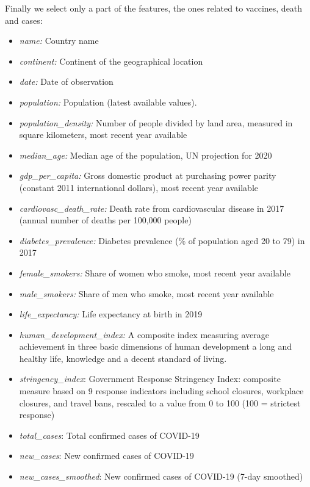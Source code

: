 \documentclass[10pt,conference]{IEEEtran}
\begin{document}
Finally we select only a part of the features, the ones related to vaccines, death and cases:
\begin{itemize}
		\item \emph{name:} Country name
		\item \emph{continent:} Continent of the geographical location
		\item \emph{date:} Date of observation
		
		\item \emph{population:} Population (latest available values).
		\item \emph{population\_density:} Number of people divided by land area, measured in square kilometers, most recent year available
		\item \emph{median\_age:} Median age of the population, UN projection for 2020
		\item \emph{gdp\_per\_capita:} Gross domestic product at purchasing power parity (constant 2011 international dollars), most recent year available
		\item \emph{cardiovasc\_death\_rate:} Death rate from cardiovascular disease in 2017 (annual number of deaths per 100,000 people)
		\item \emph{diabetes\_prevalence:} Diabetes prevalence (\% of population aged 20 to 79) in 2017
		\item \emph{female\_smokers:} Share of women who smoke, most recent year available
		\item \emph{male\_smokers:} Share of men who smoke, most recent year available
		\item \emph{life\_expectancy:} Life expectancy at birth in 2019
		\item \emph{human\_development\_index:} A composite index measuring average achievement in three basic dimensions of human development a long and healthy life, knowledge and a decent standard of living. 
		\item \emph{stringency\_index}: Government Response Stringency Index: composite measure based on 9 response indicators including school closures, workplace closures, and travel bans, rescaled to a value from 0 to 100 (100 = strictest response)
		\item \emph{total\_cases}: Total confirmed cases of COVID-19
		\item \emph{new\_cases}: New confirmed cases of COVID-19
		\item \emph{new\_cases\_smoothed}: New confirmed cases of COVID-19 (7-day smoothed)
	

\end{itemize}
\end{document}
